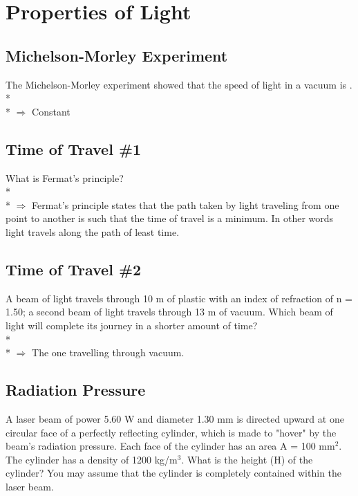 \documentclass[11pt]{article}
\begin{document}
\pagebreak
\section{Properties of Light}
\vspace{10pt}

\subsection{Michelson-Morley Experiment}
The Michelson-Morley experiment showed that the speed of light in a vacuum is \underline{\hspace{8mm}}. \\* \\*
$\Rightarrow$ Constant

\subsection{Time of Travel \#1}
What is Fermat's principle? \\* \\*
$\Rightarrow$ Fermat's principle states that the path taken by light traveling from one point to another is such that the time of travel is a minimum.  In other words light travels along the path of least time.

\subsection{Time of Travel \#2}
A beam of light travels through 10 m of plastic with an index of refraction of n = 1.50; a second beam of light travels through 13 m of vacuum.  Which beam of light will complete its journey in a shorter amount of time? \\* \\*
$\Rightarrow$ The one travelling through vacuum.

\subsection{Radiation Pressure}
A laser beam of power 5.60 W and diameter 1.30 mm is directed upward at one circular face of a perfectly reflecting cylinder, which is made to "hover" by the beam's radiation pressure.  Each face of the cylinder has an area A = 100 mm$^2$.  The cylinder has a density of 1200 kg/m$^3$.  What is the height (H) of the cylinder?  You may assume that the cylinder is completely contained within the laser beam.
\end{document}
